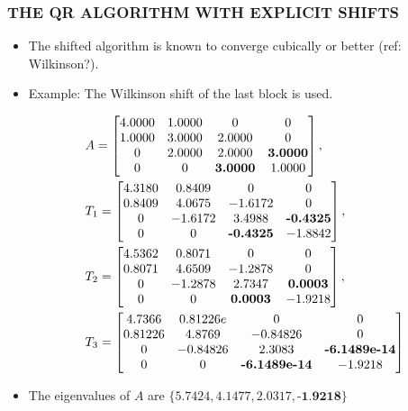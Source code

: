 \documentclass[a4paper,8pt]{beamer} %
\newcommand{\ts}[1]{\textbf{#1}}
\newcommand{\smatrix}[1]{\left[\begin{matrix} #1 \end{matrix}\right]}
\begin{document}
\begin{frame}  %
\frametitle{THE QR ALGORITHM WITH EXPLICIT SHIFTS}
\begin{itemize}
\item The shifted algorithm is known to converge cubically or better (ref: Wilkinson?).
\item Example: The Wilkinson shift of the last block is used.
\begin{tiny}
\begin{align}
&A = \smatrix{
   4.0000  & 1.0000 &       0  &      0 \\
   1.0000  & 3.0000 &  2.0000  &      0 \\
        0  & 2.0000 &  2.0000  & \ts{3.0000} \\
        0  &      0 &  \ts{3.0000}  & 1.0000 }
,\,\notag\\
&T_1 = \smatrix{
   4.3180 & 0.8409 &      0 &      0\\
   0.8409 & 4.0675 &-1.6172 &      0\\
        0 &-1.6172 & 3.4988 &\ts{-0.4325}\\
        0 &      0 &\ts{-0.4325} &-1.8842}
,\,\notag\\
&T_2 = \smatrix{
   4.5362  & 0.8071  &      0 &       0\\
   0.8071  & 4.6509  &-1.2878 &       0\\
        0  &-1.2878  & 2.7347 &  \ts{0.0003}\\
        0  &      0  & \ts{0.0003} & -1.9218}
,\,\notag\\
&T_3 = \smatrix{
   4.7366 &  0.81226e  &      0  &      0\\
   0.81226 &  4.8769  &-0.84826  &      0\\
        0 & -0.84826  & 2.3083  &\ts{-6.1489e-14}\\
        0 &       0  &\ts{-6.1489e-14}  &-1.9218}
\end{align}
\end{tiny}
\item The eigenvalues of $A$ are $\{5.7424, 4.1477, 2.0317, \ts {-1.9218} \}$
\end{itemize}
\end{frame} %
\end{document}
